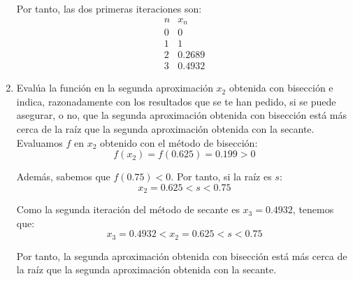 \begin{ejercicio}
\begin{enumerate}
        Por tanto, las dos primeras iteraciones son:
        \begin{equation*}
            \begin{array}{c|c}
                n & x_n\\ \hline
                0 & 0 \\
                1 & 1 \\
                2 & 0.2689\\
                3 & 0.4932
            \end{array}
        \end{equation*}
        \item Evalúa la función en la segunda aproximación $x_2$ obtenida con bisección e indica, razonadamente con los resultados que se te han pedido, si se puede asegurar, o no, que la segunda aproximación obtenida con bisección está más cerca de la raíz que la segunda aproximación obtenida con la secante.\\
        
        Evaluamos $f$ en $x_2$ obtenido con el método de bisección:
        \begin{equation*}
            f(x_2) = f(0.625) = 0.199>0
        \end{equation*}

        Además, sabemos que $f(0.75)<0$. Por tanto, si la raíz es $s$:
        \begin{equation*}
            x_2 = 0.625 < s < 0.75
        \end{equation*}

        Como la segunda iteración del método de secante es $x_3 = 0.4932$, tenemos que:
        \begin{equation*}
            x_3=0.4932 < x_2=0.625 < s < 0.75
        \end{equation*}

        Por tanto, la segunda aproximación obtenida con bisección está más cerca de la raíz que la segunda aproximación obtenida con la secante.
    \end{enumerate}
\end{ejercicio}

